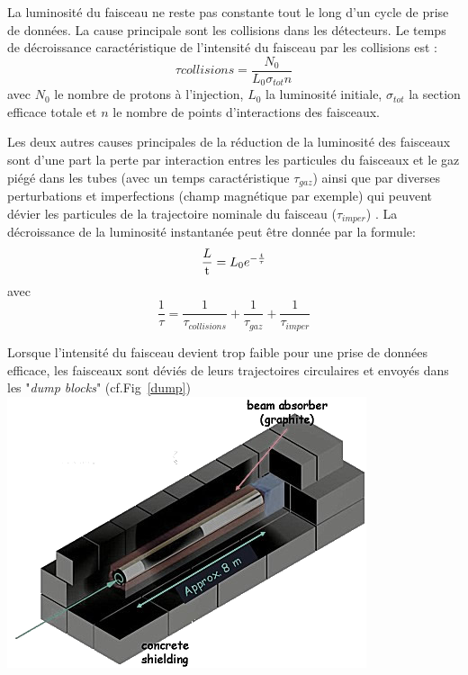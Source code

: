 La luminosité du faisceau ne reste pas constante tout le long d'un cycle de prise de données. La cause principale sont les collisions dans les détecteurs. Le temps de décroissance caractéristique de l'intensité du faisceau par les collisions est :
\begin{equation}
\tau{collisions}=\frac{N_{0}}{L_{0}\sigma_{tot}n}
\end{equation}
avec $N_{0}$ le nombre de protons à l'injection, $L_{0}$ la luminosité initiale, $\sigma_{tot}$ la section efficace totale et $n$ le nombre de points d'interactions des faisceaux.

Les deux autres causes principales de la réduction de la luminosité des faisceaux sont d'une part la perte par interaction entres les particules du faisceaux et le gaz piégé dans les tubes (avec un temps caractéristique $\tau_{gaz}$) ainsi que par diverses perturbations et imperfections (champ magnétique par exemple) qui peuvent dévier les particules de la trajectoire nominale du faisceau ($\tau_{imper}$) . 
La décroissance de la luminosité instantanée peut être donnée par la formule:
\begin{equation}
\frac{\mathrm \mathcal{L}}{\mathrm t} = L_{0} e^{-\frac{t}{\tau}}
\end{equation}
avec
\begin{equation}
\frac{1}{\tau} = \frac{1}{\tau_{collisions}}+\frac{1}{\tau_{gaz}}+\frac{1}{\tau_{imper}}
\end{equation}

Lorsque l'intensité du faisceau devient trop faible pour une prise de données efficace, les faisceaux sont déviés de leurs trajectoires circulaires et envoyés dans les "\textit{dump blocks}" (cf.Fig~\ref{dump})
\marginpar
{
	\includegraphics[width=\marginparwidth]{LHC/dump.png}
    	\label{dump}
}

